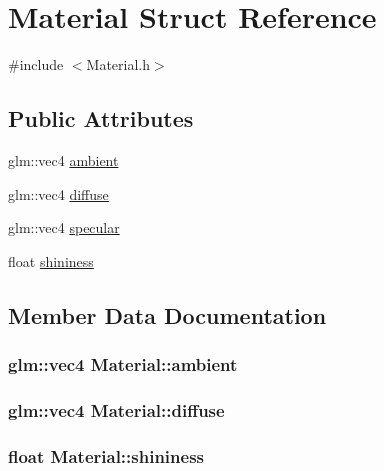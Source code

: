 \hypertarget{struct_material}{}\section{Material Struct Reference}
\label{struct_material}


{\ttfamily \#include $<$Material.\+h$>$}

\subsection*{Public Attributes}
\begin{DoxyCompactItemize}
\item 
glm\+::vec4 \hyperlink{struct_material_a8ae15e86148278900783f3c482b26e13}{ambient}
\item 
glm\+::vec4 \hyperlink{struct_material_ac16a53d915f8dbc0d699a541a6d93733}{diffuse}
\item 
glm\+::vec4 \hyperlink{struct_material_ac891eeb20e11ff60f412484011d051b2}{specular}
\item 
float \hyperlink{struct_material_a9dc184c883ec135ace28c1917af3fe84}{shininess}
\end{DoxyCompactItemize}


\subsection{Member Data Documentation}
\subsubsection[{\texorpdfstring{ambient}{ambient}}]{\setlength{\rightskip}{0pt plus 5cm}glm\+::vec4 Material\+::ambient}\hypertarget{struct_material_a8ae15e86148278900783f3c482b26e13}{}\label{struct_material_a8ae15e86148278900783f3c482b26e13}
\subsubsection[{\texorpdfstring{diffuse}{diffuse}}]{\setlength{\rightskip}{0pt plus 5cm}glm\+::vec4 Material\+::diffuse}\hypertarget{struct_material_ac16a53d915f8dbc0d699a541a6d93733}{}\label{struct_material_ac16a53d915f8dbc0d699a541a6d93733}
\subsubsection[{\texorpdfstring{shininess}{shininess}}]{\setlength{\rightskip}{0pt plus 5cm}float Material\+::shininess}\hypertarget{struct_material_a9dc184c883ec135ace28c1917af3fe84}{}\label{struct_material_a9dc184c883ec135ace28c1917af3fe84}
